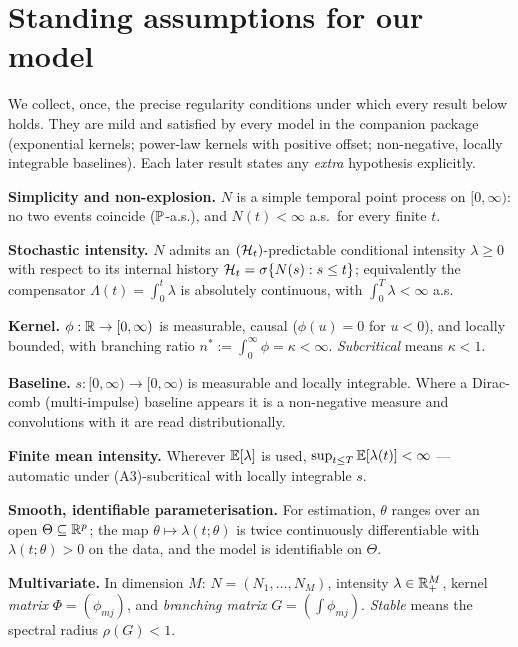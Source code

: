 \section{Standing assumptions for our model}
\label{sec:assumptions}

We collect, once, the precise regularity conditions under which every result
below holds. They are mild and satisfied by every model in the companion package
(exponential kernels; power-law kernels with positive offset; non-negative,
locally integrable baselines). Each later result states any \emph{extra}
hypothesis explicitly.

\begin{standing}
\item \textbf{Simplicity and non-explosion.} $N$ is a simple temporal point
process on $[0,\infty)$: no two events coincide ($\mathbb{P}$-a.s.), and $N(t)<\infty$
a.s.\ for every finite $t$.
\item \textbf{Stochastic intensity.} $N$ admits an $(\mathcal{H}_t)$-predictable
conditional intensity $\lambda\ge 0$ with respect to its internal history
$\mathcal{H}_t=\sigma\{N(s):s\le t\}$; equivalently the compensator
$\Lambda(t)=\int_0^t\lambda$ is absolutely continuous, with $\int_0^T\lambda<\infty$
a.s.
\item \textbf{Kernel.} $\phi:\mathbb{R}\to[0,\infty)$ is measurable, causal ($\phi(u)=0$
for $u<0$), and locally bounded, with branching ratio
$n^{*}:=\int_0^\infty\phi=\kappa<\infty$. \emph{Subcritical} means $\kappa<1$.
\item \textbf{Baseline.} $s:[0,\infty)\to[0,\infty)$ is measurable and locally
integrable. Where a Dirac-comb (multi-impulse) baseline appears it is a
non-negative measure and convolutions with it are read distributionally.
\item \textbf{Finite mean intensity.} Wherever $\mathbb{E}[\lambda]$ is used,
$\sup_{t\le T}\mathbb{E}[\lambda(t)]<\infty$ --- automatic under (A3)-subcritical with
locally integrable $s$.
\item \textbf{Smooth, identifiable parameterisation.} For estimation, $\theta$
ranges over an open $\Theta\subseteq\mathbb{R}^p$; the map $\theta\mapsto\lambda(t;\theta)$
is twice continuously differentiable with $\lambda(t;\theta)>0$ on the data, and
the model is identifiable on $\Theta$.
\item \textbf{Multivariate.} In dimension $M$: $N=(N_1,\dots,N_M)$, intensity
$\lambda\in\mathbb{R}_+^M$, kernel \emph{matrix} $\Phi=(\phi_{mj})$, and \emph{branching
matrix} $G=(\int\phi_{mj})$. \emph{Stable} means the spectral radius
$\rho(G)<1$.
\end{standing}

